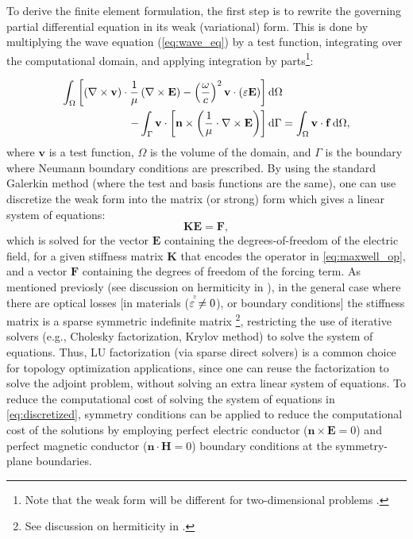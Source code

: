     To derive the finite element formulation, the first step is to rewrite the governing partial differential equation in its weak (variational) form. This is done by multiplying the wave equation (\eqref{eq:wave_eq}) by a test function, integrating over the computational domain, and applying integration by parts\footnote{Note that the weak form will be different for two-dimensional problems \cite{ownpub0, ownpub2}.}:

    \begin{align}
        \int_\Omega \left[ \left( \nabla \times \mathbf{v} \right) \cdot
            \frac{1}{\mu} \left( \nabla \times \mathbf{E} \right)- \left(\frac{\omega}{c}\right)^2 \mathbf{v}\cdot(\varepsilon\mathbf{E})\right]& \mathop{}\!\text{d} \Omega \\
        - \int_\Gamma \mathbf{v} \cdot \left[ \mathbf{n} \times \left(
            \frac{1}{\mu} \cdot \nabla \times \mathbf{E} \right) \right]& \mathop{}\!\text{d} \Gamma 
        = \int_\Omega \mathbf{v} \cdot \mathbf{f} \mathop{}\!\text{d} \Omega,
    \end{align}
    where $\mathbf{v}$ is a test function, $\Omega$ is the volume of the domain,
    and $\Gamma$ is the boundary where Neumann boundary conditions
    are prescribed. By using
    the standard Galerkin method (where the test and basis functions are the same),
    one can use discretize the weak form
    into the matrix (or strong) form which gives a linear system of equations:
    \begin{equation}\label{eq:discretized}
        \mathbf{K} \mathbf{E} = \mathbf{F},
    \end{equation}
    which is solved for the vector $\mathbf{E}$ containing the degrees-of-freedom of the electric field, for a given stiffness matrix $\mathbf{K}$ that encodes the operator 
    in \eqref{eq:maxwell_op}, and a 
    vector $\mathbf{F}$ containing the degrees of freedom of the forcing term. As mentioned previosly (see discussion on hermiticity in ), in the general case where there are optical losses [in materials ($\varepsilon^{\tilde \tilde} \neq 0$), or boundary conditions] the stiffness matrix is a sparse symmetric indefinite matrix \footnote{See discussion on hermiticity
    in .},
    restricting the use of iterative solvers
    (e.g., Cholesky factorization, Krylov method) to solve the system of equations.
    Thus, LU factorization (via sparse direct solvers) is
    a common choice for topology optimization applications, since one can reuse the factorization to solve
    the adjoint problem, without solving an extra linear system of equations. To reduce the computational cost of solving the system of equations in 
    \eqref{eq:discretized}, symmetry conditions can be applied to reduce the computational
    cost of the solutions by employing perfect electric conductor ($\mathbf{n} \times \mathbf{E}=0$) and perfect
    magnetic
    conductor ($\mathbf{n} \cdot \mathbf{H}=0$) boundary conditions at the symmetry-plane boundaries.

